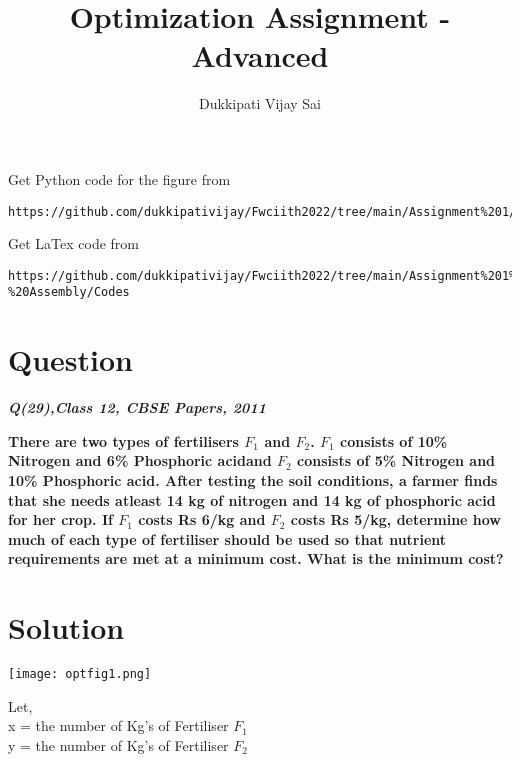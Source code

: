 \documentclass[journal,12pt,twocolumn]{IEEEtran}
\begin{document}
\makeatother
\let\StandardTheFigure\thefigure
\let\vec\mathbf
\renewcommand{\thefigure}{\theproblem}
\def\putbox#1#2#3{\makebox[0in][l]{\makebox[#1][l]{}\raisebox{\baselineskip}[0in][0in]{\raisebox{#2}[0in][0in]{#3}}}}
     \def\rightbox#1{\makebox[0in][r]{#1}}
     \def\centbox#1{\makebox[0in]{#1}}
     \def\topbox#1{\raisebox{-\baselineskip}[0in][0in]{#1}}
     \def\midbox#1{\raisebox{-0.5\baselineskip}[0in][0in]{#1}}
\vspace{3cm}
\title{\textbf{Optimization Assignment - Advanced} }
\author{Dukkipati Vijay Sai}
\maketitle
\newpage
\bigskip
\renewcommand{\thefigure}{\theenumi}
\renewcommand{\thetable}{\theenumi}
Get Python code for the figure from 
\begin{lstlisting}
https://github.com/dukkipativijay/Fwciith2022/tree/main/Assignment%201/Codes/src
\end{lstlisting}
Get LaTex code from
\begin{lstlisting}
https://github.com/dukkipativijay/Fwciith2022/tree/main/Assignment%201%20-%20Assembly/Codes
\end{lstlisting}
%
\section{Question}
\centering
\textbf{\textit{Q(29),Class 12, CBSE Papers, 2011}}\\
\vspace{0.25cm}
\raggedright
\textbf{There are two types of fertilisers $F_1$ and $F_2$. $F_1$ consists of 10\% Nitrogen and 6\% Phosphoric acidand $F_2$ consists of 5\% Nitrogen and 10\% Phosphoric acid. After testing the soil conditions, a farmer finds that she needs atleast 14 kg of nitrogen and 14 kg of phosphoric acid for her crop. If $F_1$ costs Rs 6/kg and $F_2$ costs Rs 5/kg, determine how much of each type of fertiliser should be used so that nutrient requirements are met at a minimum cost. What is the minimum cost? }\\
\raggedright
\section{Solution}
\texttt{[image: optfig1.png]}
\vspace{0.25cm}
\raggedright
Let,\\

\vspace{0.2cm}
x = the number of Kg's of Fertiliser $F_1$\\
\vspace{0.2cm}
y = the number of Kg's of Fertiliser $F_2$\\
\vspace{0.5cm}
\end{document}
